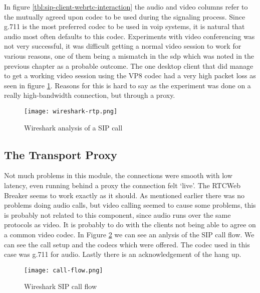 In figure \ref{tbl:sip-client-webrtc-interaction} the audio and video columns refer to the mutually agreed upon codec to be used during the signaling process. Since g.711 is the most preferred codec to be used in \gls{voip} systems, it is natural that audio most often defaults to this codec. Experiments with video conferencing was not very successful, it was difficult getting a normal video session to work for various reasons, one of them being a mismatch in the \gls{sdp} which was noted in the previous chapter as a probable outcome. The one desktop client that did manage to get a working video session using the VP8 codec had a very high packet loss as seen in figure \ref{fig:wireshark-sip-call}. Reasons for this is hard to say as the experiment was done on a really high-bandwidth connection, but through a proxy.

\begin{figure}[here]
\centerline{\texttt{[image: wireshark-rtp.png]}}
\caption{Wireshark analysis of a SIP call}
\label{fig:wireshark-sip-call}
\end{figure}

\subsection{The Transport Proxy}
Not much problems in this module, the connections were smooth with low latency, even running behind a proxy the connection felt `live'. The RTCWeb Breaker seems to work exactly as it should. As mentioned earlier there was no problems doing audio calls, but video calling seemed to cause some problems, this is probably not related to this component, since audio runs over the same protocols as video. It is probably to do with the clients not being able to agree on a common video codec. In Figure \ref{fig:wireshark-sip-call-flow} we can see an anlysis of the SIP call flow. We can see the call setup and the codecs which were offered. The codec used in this case was g.711 for audio. Lastly there is an acknowledgement of the hang up.

\begin{figure}[here]
\centerline{\texttt{[image: call-flow.png]}}
\caption{Wireshark SIP call flow}
\label{fig:wireshark-sip-call-flow}
\end{figure}

